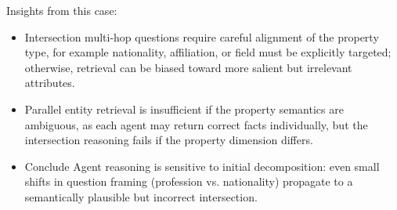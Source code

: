 Insights from this case:
\begin{itemize}
    \item Intersection multi-hop questions require careful alignment of the property type, for example nationality, affiliation, or field must be explicitly targeted; otherwise, retrieval can be biased toward more salient but irrelevant attributes.
    \item Parallel entity retrieval is insufficient if the property semantics are ambiguous, as each agent may return correct facts individually, but the intersection reasoning fails if the property dimension differs.
    \item Conclude Agent reasoning is sensitive to initial decomposition: even small shifts in question framing (profession vs. nationality) propagate to a semantically plausible but incorrect intersection.
\end{itemize}
